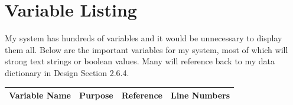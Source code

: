 \section{Variable Listing}

My system has hundreds of variables and it would be unnecessary to display them all. Below are the important variables for my system, most of which will strong text strings or boolean values. Many will reference back to my data dictionary in Design Section 2.6.4.

\begin{center}
    \begin{longtable}{|p{4cm}|p{3cm}|p{2cm}|p{3cm}|}
    \hline
	\textbf{Variable Name} & \textbf{Purpose} & \textbf{Reference}&  \textbf{Line Numbers} \\ \hline


\end{longtable}
\end{center}
